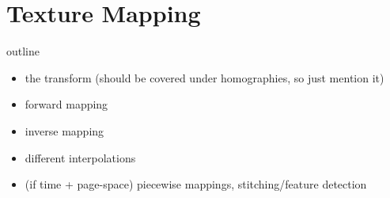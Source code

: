 \section{Texture Mapping} 



outline
\begin{itemize}
	\item the transform (should be covered under homographies, so just
	mention it)
	\item forward mapping
	\item inverse mapping
	\item different interpolations
	\item (if time + page-space) piecewise mappings, stitching/feature detection
\end{itemize}
